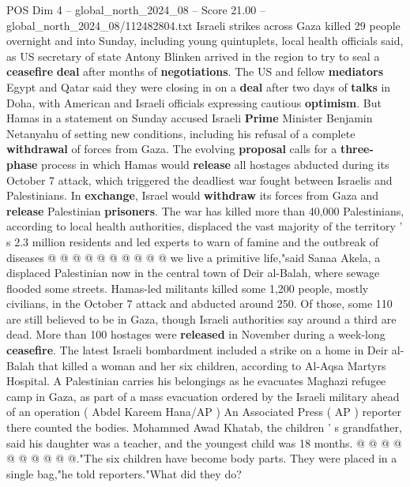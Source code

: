 \begin{textsample}{POS Dim 4 – global\_north\_2024\_08 – Score 21.00 – global\_north\_2024\_08/112482804.txt}  \label{ex:f4_pos_160}
Israeli strikes across Gaza killed 29 people overnight and into Sunday, including young quintuplets, local health officials said, as US secretary of state Antony Blinken arrived in the region to try to seal a \textbf{ceasefire} \textbf{deal} after months of \textbf{negotiations}.
The US and fellow \textbf{mediators} Egypt and Qatar said they were closing in on a \textbf{deal} after two days of \textbf{talks} in Doha, with American and Israeli officials expressing cautious \textbf{optimism}.
But Hamas in a statement on Sunday accused Israeli \textbf{Prime} Minister Benjamin Netanyahu of setting new conditions, including his refusal of a complete \textbf{withdrawal} of forces from Gaza.
The evolving \textbf{proposal} calls for a \textbf{three-phase} process in which Hamas would \textbf{release} all hostages abducted during its October 7 attack, which triggered the deadliest war fought between Israelis and Palestinians.
In \textbf{exchange}, Israel would \textbf{withdraw} its forces from Gaza and \textbf{release} Palestinian \textbf{prisoners}.
The war has killed more than 40,000 Palestinians, according to local health authorities, displaced the vast majority of the territory ' s 2.3 million residents and led experts to warn of famine and the outbreak of diseases @ @ @ @ @ @ @ @ @ @ we live a primitive life,"said Sanaa Akela, a displaced Palestinian now in the central town of Deir al-Balah, where sewage flooded some streets.
Hamas-led militants killed some 1,200 people, mostly civilians, in the October 7 attack and abducted around 250.
Of those, some 110 are still believed to be in Gaza, though Israeli authorities say around a third are dead.
More than 100 hostages were \textbf{released} in November during a week-long \textbf{ceasefire}.
The latest Israeli bombardment included a strike on a home in Deir al-Balah that killed a woman and her six children, according to Al-Aqsa Martyrs Hospital.
A Palestinian carries his belongings as he evacuates Maghazi refugee camp in Gaza, as part of a mass evacuation ordered by the Israeli military ahead of an operation ( Abdel Kareem Hana/AP ) An Associated Press ( AP ) reporter there counted the bodies.
Mohammed Awad Khatab, the children ' s grandfather, said his daughter was a teacher, and the youngest child was 18 months. @ @ @ @ @ @ @ @ @ @."The six children have become body parts.
They were placed in a single bag,"he told reporters."What did they do?

\end{textsample}
